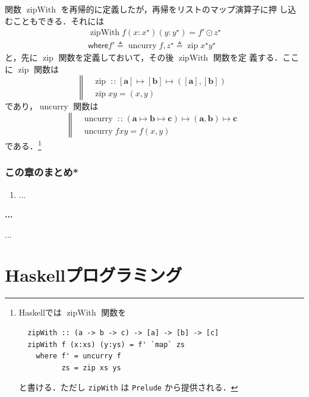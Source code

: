 \documentclass[a5paper,twoside,fleqn,draft]{jsbook}
\newcommand{\programminglanguage}[1]{\textsf{#1}}
\newcommand{\haskell}{\programminglanguage{Haskell}}
\newenvironment{note}[1]{\begin{boxnote}\begin{center}\textbf{#1}\end{center}}{\end{boxnote}}
\newcommand{\code}[1]{\texttt{#1}}
\newcommand{\filename}[1]{\texttt{#1}}
\newcommand{\mBrace}{\Vert}
\newcommand{\mKeyword}[1]{\mathsf{#1}} %
\newcommand{\mWhereKeyword}{\mKeyword{where}}
\newcommand{\mSpecialFunc}[1]{\mathrm{#1}}
\DeclareMathOperator{\mUncurry}{\mSpecialFunc{uncurry}}
\DeclareMathOperator{\mZipFunc}{\mSpecialFunc{zip}}
\DeclareMathOperator{\mZipWith}{\mSpecialFunc{zipWith}}
\DeclareMathOperator{\mIn}{{:\!:}}
\DeclareMathOperator{\mLetEq}{\triangleq}
\DeclareMathOperator{\mMapList}{\odot}
\DeclareMathOperator{\mMapsTo}{\mapsto}
\newcommand{\mType}[1]{\mathbf{#1}}
\newcommand{\mListType}[1]{[\mType{#1}]}
\newcommand{\mList}[1]{{#1}^\mathrm{\star}}
\newcommand{\mProj}[2]{#1\mMapsTo#2}
\newcommand{\mWhereIsII}[4]{\mathbin{\mWhereKeyword}#1\mLetEq#2,#3\mLetEq#4}
\begin{document}
関数 $\mZipWith$ を再帰的に定義したが，再帰をリストのマップ演算子に押
し込むこともできる．それには
\begin{multline}
\mZipWith f(x:\mList{x})(y:\mList{y})=f'\mMapList\mList{z}\\
\mWhereIsII{f'}{\mUncurry f}{\mList{z}}{\mZipFunc\mList{x}\mList{y}}
\end{multline}
と，先に $\mZipFunc$ 関数を定義しておいて，その後 $\mZipWith$ 関数を定
義する．ここに $\mZipFunc$ 関数は
\begin{equation}
  \left\mBrace
  \begin{aligned}
    {}&\mZipFunc\mIn{}\mProj{\mListType{a}}
    {\mProj{\mListType{b}}
      {(\mListType{a},\mListType{b})}}\\
    {}&\mZipFunc xy=(x,y)
  \end{aligned}
  \right.
\end{equation}
であり，$\mUncurry$ 関数は
\begin{equation}
  \left\mBrace
  \begin{aligned}
    {}&\mUncurry\mIn{}
    \mProj{(\mProj{\mType{a}}{\mProj{\mType{b}}{\mType{c}}})}
          {\mProj{(\mType{a},\mType{b})}{\mType{c}}}\\
          {}&\mUncurry fxy=f(x,y)
  \end{aligned}
  \right.
\end{equation}
である．\footnote{\haskell では $\mZipWith$ 関数を
\begin{verbatim}
  zipWith :: (a -> b -> c) -> [a] -> [b] -> [c]
  zipWith f (x:xs) (y:ys) = f' `map` zs
    where f' = uncurry f
          zs = zip xs ys
\end{verbatim}
と書ける．ただし \code{zipWith} は \filename{Prelude} から提供される．}


\section{この章のまとめ*}

\begin{enumerate}
\item ...
\end{enumerate}

\begin{note}{...}
...
\end{note}


\part{\haskell プログラミング}
\end{document}
